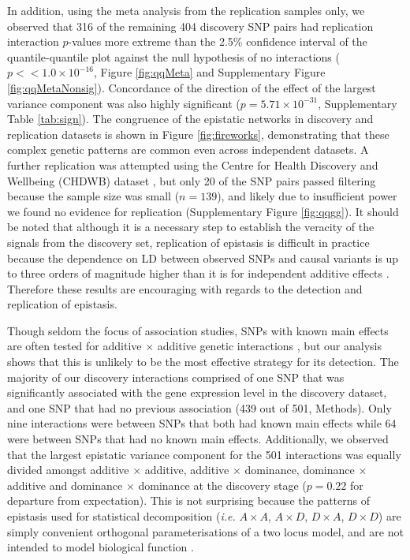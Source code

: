\documentclass{article}
\begin{document}
In addition, using the meta analysis from the replication samples only, we observed that 316 of the remaining 404 discovery SNP pairs had replication interaction $p$-values more extreme than the 2.5\% confidence interval of the quantile-quantile plot against the null hypothesis of no interactions ($p << 1.0 \times 10^{-16}$, Figure \ref{fig:qqMeta} and Supplementary Figure \ref{fig:qqMetaNonsig}). Concordance of the direction of the effect of the largest variance component was also highly significant ($p = 5.71 \times 10^{-31}$, Supplementary Table \ref{tab:sign}). The congruence of the epistatic networks in discovery and replication datasets is shown in Figure \ref{fig:fireworks}, demonstrating that these complex genetic patterns are common even across independent datasets. A further replication was attempted using the Centre for Health Discovery and Wellbeing (CHDWB) dataset \cite{Preininger2013}, but only 20 of the SNP pairs passed filtering because the sample size was small ($n=139$), and likely due to insufficient power we found no evidence for replication (Supplementary Figure \ref{fig:qqgg}). It should be noted that although it is a necessary step to establish the veracity of the signals from the discovery set, replication of epistasis is difficult in practice because the dependence on LD between observed SNPs and causal variants is up to three orders of magnitude higher than it is for independent additive effects \cite{Weir2008, Hemani2013}. Therefore these results are encouraging with regards to the detection and replication of epistasis.


Though seldom the focus of association studies, SNPs with known main effects are often tested for additive $\times$ additive genetic interactions \cite{Cordell2009}, but our analysis shows that this is unlikely to be the most effective strategy for its detection. The majority of our discovery interactions comprised of one SNP that was significantly associated with the gene expression level in the discovery dataset, and one SNP that had no previous association \cite{Powell2013} (439 out of 501, Methods). Only nine interactions were between SNPs that both had known main effects while 64 were between SNPs that had no known main effects. Additionally, we observed that the largest epistatic variance component for the 501 interactions was equally divided amongst additive $\times$ additive, additive $\times$ dominance, dominance $\times$ additive and dominance $\times$ dominance at the discovery stage ($p = 0.22$ for departure from expectation). This is not surprising because the patterns of epistasis used for statistical decomposition (\emph{i.e.} $A \times A$, $A \times D$, $D \times A$, $D \times D$) are simply convenient orthogonal parameterisations of a two locus model, and are not intended to model biological function \cite{Cockerham1954}.
\end{document}
